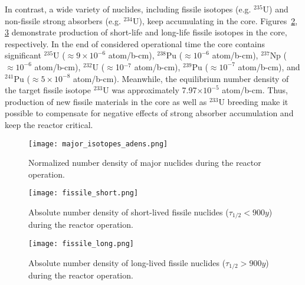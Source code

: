 In contrast, a wide variety of nuclides, including fissile isotopes (e.g. $^{235}$U) and non-fissile strong absorbers (e.g. $^{234}$U), keep accumulating in the core. Figures~\ref{fig:fissile_short}, \ref{fig:fissile_long} demonstrate production of short-life and long-life fissile isotopes in the core, respectively. In the end of considered operational time the core contains significant $^{235}$U ($\approx 9\times10^{-6}$ atom/b-cm), $^{238}$Pu ($\approx 10^{-6}$ atom/b-cm), $^{237}$Np ($\approx10^{-6}$ atom/b-cm), $^{232}$U ($\approx$10$^{-7}$ atom/b-cm), $^{239}$Pu ($\approx10^{-7}$ atom/b-cm), and $^{241}$Pu ($\approx 5\times10^{-8}$ atom/b-cm). Meanwhile, the equilibrium number density of the target fissile isotope $^{233}$U was approximately 7.97$\times10^{-5}$ atom/b-cm. Thus, production of new fissile materials in the core as well as $^{233}$U breeding make it possible to compensate for negative effects of strong absorber accumulation and keep the reactor critical.

\begin{figure}[htp!] %
  \centering
  \vspace{-0.3em}
  \texttt{[image: major\_isotopes\_adens.png]}
  \caption{Normalized number density of major nuclides during the reactor operation.}
  \vspace{-0.6em}
  \label{fig:adens_eq}
\end{figure}
\FloatBarrier

\begin{figure}[htp!] %
  \centering
  \vspace{-1.3em}
  \texttt{[image: fissile\_short.png]}
   \vspace{-1.5em}
  \caption{Absolute number density of short-lived fissile nuclides ($\tau_{1/2}<900y$) during the reactor operation.}
  \vspace{-1.6em}
  \label{fig:fissile_short}
\end{figure}
\begin{figure}[hbp!] %
  \centering
  \vspace{-0.3em}
  \texttt{[image: fissile\_long.png]}
   \vspace{-1.5em}
  \caption{Absolute number density of long-lived fissile nuclides ($\tau_{1/2}>900y$) during the reactor operation.}
  \vspace{-2.6em}
  \label{fig:fissile_long}
\end{figure}
\FloatBarrier

